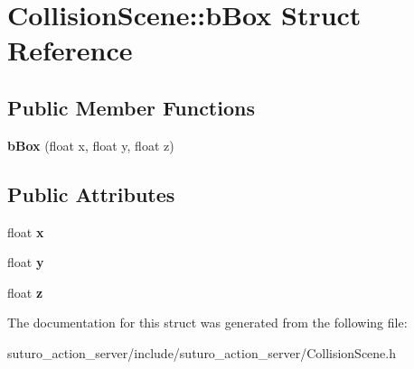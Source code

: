 \hypertarget{structCollisionScene_1_1bBox}{\section{Collision\-Scene\-:\-:b\-Box Struct Reference}
\label{structCollisionScene_1_1bBox}
}
\subsection*{Public Member Functions}
\begin{DoxyCompactItemize}
\item 
\hypertarget{structCollisionScene_1_1bBox_ad9f6bbe6943643ba48ba8945ca7d9108}{{\bfseries b\-Box} (float x, float y, float z)}\label{structCollisionScene_1_1bBox_ad9f6bbe6943643ba48ba8945ca7d9108}

\end{DoxyCompactItemize}
\subsection*{Public Attributes}
\begin{DoxyCompactItemize}
\item 
\hypertarget{structCollisionScene_1_1bBox_a29ee0f7ab0c38c25cf8a322b4ef7b641}{float {\bfseries x}}\label{structCollisionScene_1_1bBox_a29ee0f7ab0c38c25cf8a322b4ef7b641}

\item 
\hypertarget{structCollisionScene_1_1bBox_af538879099c49b49d5ed64f28e3a543b}{float {\bfseries y}}\label{structCollisionScene_1_1bBox_af538879099c49b49d5ed64f28e3a543b}

\item 
\hypertarget{structCollisionScene_1_1bBox_a4105da0d12ad900729b712620fb4eba6}{float {\bfseries z}}\label{structCollisionScene_1_1bBox_a4105da0d12ad900729b712620fb4eba6}

\end{DoxyCompactItemize}


The documentation for this struct was generated from the following file\-:\begin{DoxyCompactItemize}
\item 
suturo\-\_\-action\-\_\-server/include/suturo\-\_\-action\-\_\-server/Collision\-Scene.\-h\end{DoxyCompactItemize}
